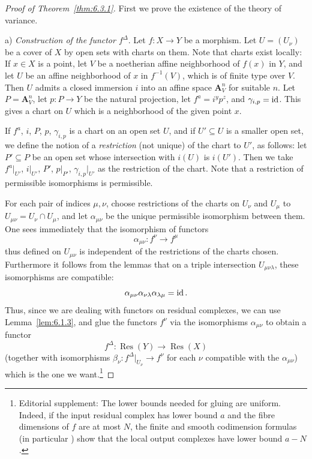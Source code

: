 \begin{proof}[Proof of Theorem~\ref{thm:6.3.1}]
\begingroup
\setlength{\emergencystretch}{2em}
First we prove the existence of the theory of variance.

\medskip{}\label{construction:6.3.a}\noindent a) \textit{Construction of the functor $f^{\Delta}$}. Let $f\colon X\to Y$ be a morphism. Let $U = (U_{\nu})$ be a cover of $X$ by open sets with charts on them. Note that charts exist locally: If $x\in X$ is a point, let $V$ be a noetherian affine neighborhood of $f(x)$ in $Y$, and let $U$ be an affine neighborhood of $x$ in $f^{-1}(V)$, which is of finite type over $V$. Then $U$ admits a closed immersion $i$ into an affine space $\mathbf{A}_{V}^{n}$ for suitable $n$. Let $P=\mathbf{A}_{V}^{n}$, let $p\colon P\to Y$ be the natural projection, let $f^{a}=i^{y}p^{z}$, and $\gamma_{i,p}=\operatorname{id}$. This gives a chart on $U$ which is a neighborhood of the given point $x$.

If $f^{a}$, $i$, $P$, $p$, $\gamma_{i,p}$ is a chart on an open set $U$, and if $U'\subseteq U$ is a smaller open set, we define the notion of a \emph{restriction} (not unique) of the chart to $U'$, as follows: let $P'\subseteq P$ be an open set whose intersection with $i(U)$ is $i(U')$. Then we take $f^{a}|_{U'}$, $i|_{U'}$, $P'$, $p|_{P'}$, $\gamma_{i,p}|_{U'}$ as the restriction of the chart. Note that a restriction of permissible isomorphisms is permissible.

For each pair of indices $\mu,\nu$, choose restrictions of the charts on $U_{\nu}$ and $U_{\mu}$ to $U_{\mu\nu}=U_{\nu}\cap U_{\mu}$, and let $\alpha_{\mu\nu}$ be the unique permissible isomorphism between them. One sees immediately that the isomorphism of functors
\[
\alpha_{\mu\nu}\colon f^{\nu}\longrightarrow f^{\mu}
\]
thus defined on $U_{\mu\nu}$ is independent of the restrictions of the charts chosen. Furthermore it follows from the lemmas that on a triple intersection $U_{\mu\nu\lambda}$, these isomorphisms are compatible:
\[
\alpha_{\mu\nu}\alpha_{\nu\lambda}\alpha_{\lambda\mu} = \operatorname{id}.
\]
Thus, since we are dealing with functors on residual complexes, we can use Lemma~\ref{lem:6.1.3}, and glue the functors $f^{\nu}$ via the isomorphisms $\alpha_{\mu\nu}$ to obtain a functor
\[
f^{\Delta}\colon \operatorname{Res}(Y)\longrightarrow \operatorname{Res}(X)
\]
(together with isomorphisms $\beta_{\nu}\colon f^{\Delta}|_{U_{\nu}}\to f^{\nu}$ for each $\nu$ compatible with the $\alpha_{\mu\nu}$) which is the one we want.\footnote{Editorial supplement: The lower bounds needed for gluing are uniform. Indeed, if the input residual complex has lower bound $a$ and the fibre dimensions of $f$ are at most $N$, the finite and smooth codimension formulas (in particular ) show that the local output complexes have lower bound $a-N$.}


\end{proof}
